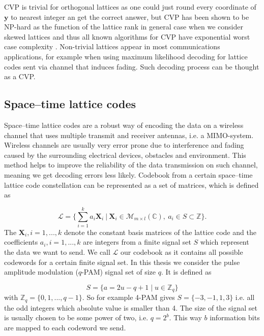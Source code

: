 \documentclass[english,12pt,a4paper,pdftex,sci,utf8]{aaltothesis}
\begin{document}
CVP is trivial for orthogonal lattices as one could just round every coordinate of $\mathbf{y}$ to nearest integer an get the correct answer, but CVP has been shown to be NP-hard as the function of the lattice rank in general case when we consider skewed lattices and thus all known algorithms for CVP have exponential worst case complexity \cite{agrell}. Non-trivial lattices appear in most communications applications, for example when using maximum likelihood decoding for lattice codes sent via channel that induces fading. Such decoding process can be thought as a CVP. %

\subsection{Space--time lattice codes}

Space--time lattice codes are a robust way of encoding the data on a  wireless channel that uses multiple transmit and receiver antennas, i.e. a MIMO-system. Wireless channels are usually very error prone due to interference and fading caused by the surrounding electrical devices, obstacles and environment. This method helps to improve the reliability of the data transmission on such channel, meaning we get decoding errors less likely. Codebook from a certain space--time lattice code constellation can be represented as a set of matrices, which is defined as

\begin{equation}
\mathcal{L} = \Bigg\{\sum_{i=1}^k a_i\mathbf{X}_i \ \Big| \ \mathbf{X}_i \in \mathcal{M}_{m \times l}(\mathbb{C}), \ a_i \in S \subset \mathbb{Z} \Bigg\}.
\label{eq:codeword}
\end{equation}
The $\mathbf{X}_i, i = 1,...,k$ denote the constant basis matrices of the lattice code and the coefficients $a_i, i = 1,...,k$ are integers from a finite signal set $S$ which represent the data we want to send. We call $\mathcal{L}$ our codebook as it contains all possible codewords for a certain finite signal set. In this thesis we consider the pulse amplitude modulation ($q$-PAM) signal set of size $q$. It is defined as

\begin{equation}
S = \{a = 2u-q+1\mid u \in \mathbb{Z}_q\}
\label{eq:pam}
\end{equation}
with $\mathbb{Z}_q = \{0,1,...,q-1\}$. So for example 4-PAM gives $S = \{-3, -1,1,3\}$ i.e. all the odd integers which absolute value is smaller than 4. The size of the signal set is usually chosen to be some power of two, i.e. $q = 2^b$. This way $b$ information bits are mapped to each codeword we send. \cite{mia} 
\end{document}
